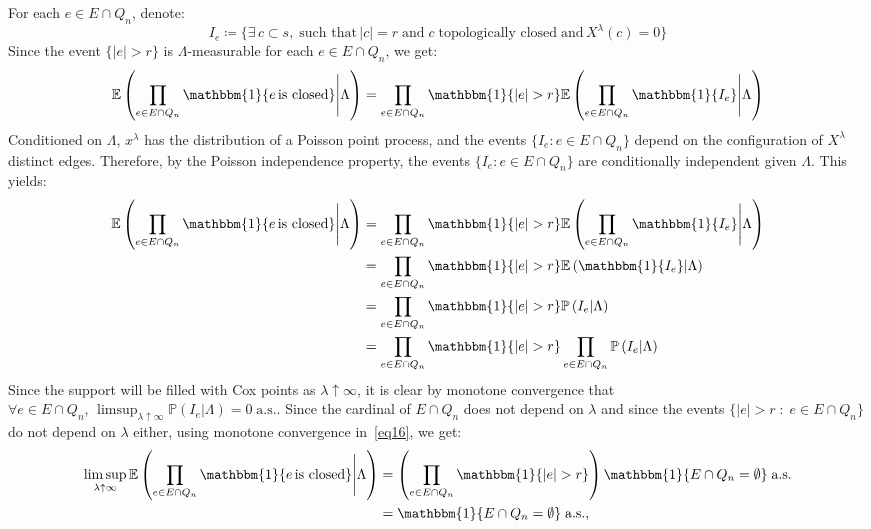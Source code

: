 \documentclass[10pt,a4paper]{amsart}
\theoremstyle{exampstyle}
\theoremstyle{exampnotations}
\begin{document}
For each $e \in E \cap Q_n$, denote:
$$I_e \coloneqq \lbrace \exists \, c \subset s, \; \text{such that} \, \vert c \vert = r \; \text{and} \; c  \; \text{topologically closed} \; \text{and} \,  X^{\lambda}(c) = 0 \rbrace$$
Since the event $\lbrace \vert e \vert > r \rbrace$ is $\Lambda$-measurable for each $e \in E \cap Q_n$, we get:
\begin{equation*}
\mathbb{E}\left( \prod_{e \in E \cap Q_n} \mathbbm{1} \lbrace e \, \text{is closed} \rbrace \Bigg\vert \Lambda \right) = \prod_{e \in E \cap Q_n} \mathbbm{1} \lbrace \vert e \vert > r \rbrace \mathbb{E}\left( \prod_{e \in E \cap Q_n}  \mathbbm{1} \lbrace I_e \rbrace \Bigg\vert \Lambda \right)
\end{equation*}
Conditioned on $\Lambda$, $x^{\lambda}$ has the distribution of a Poisson point process, and the events $\lbrace I_e : e \in E \cap Q_n \rbrace$ depend on the configuration of $X^{\lambda}$ distinct edges. Therefore, by the Poisson independence property, the events $\lbrace I_e : e \in E \cap Q_n \rbrace$ are conditionally independent given $\Lambda$. This yields:
\begin{align}
\nonumber \mathbb{E}\left( \prod_{e \in E \cap Q_n} \mathbbm{1} \lbrace e \, \text{is closed} \rbrace \Bigg\vert \Lambda \right) &= \prod_{e \in E \cap Q_n} \mathbbm{1} \lbrace \vert e \vert > r \rbrace \mathbb{E}\left( \prod_{e \in E \cap Q_n}  \mathbbm{1} \lbrace I_e \rbrace \Bigg\vert \Lambda \right)
\\ \nonumber  &= \prod_{e \in E \cap Q_n} \mathbbm{1} \lbrace \vert e \vert > r \rbrace \mathbb{E}\left(  \mathbbm{1} \lbrace I_e \rbrace \vert \Lambda \right)
\\ \nonumber &= \prod_{e \in E \cap Q_n} \mathbbm{1} \lbrace \vert e \vert > r \rbrace \mathbb{P}\left(   I_e  \vert \Lambda \right)
\\ \label{eq16} &= \prod_{e \in E \cap Q_n} \mathbbm{1} \lbrace \vert e \vert > r \rbrace \prod_{e \in E \cap Q_n}\mathbb{P}\left(   I_e  \vert \Lambda \right)
\end{align}
Since the support will be filled with Cox points as $\lambda \uparrow \infty$, it is clear by monotone convergence that $\displaystyle \forall e \in E \cap Q_n, \, \limsup_{\lambda \uparrow \infty} \mathbb{P}(I_e \vert \Lambda) = 0 \; \text{a.s.}$. Since the cardinal of $E \cap Q_n$ does not depend on $\lambda$ and since the events $\lbrace \vert e \vert > r \; : \; e \in E \cap Q_n \rbrace$ do not depend on $\lambda$ either, using monotone convergence in~\eqref{eq16}, we get:
\begin{align}
   \nonumber  \limsup_{\lambda \uparrow \infty} \mathbb{E}\left( \prod_{e \in E \cap Q_n} \mathbbm{1} \lbrace e \, \text{is closed} \rbrace \Bigg\vert \Lambda \right) &= \left(\prod_{e \in E \cap Q_n} \mathbbm{1} \lbrace \vert e \vert > r \rbrace \right) \mathbbm{1}\lbrace E \cap Q_n = \emptyset \rbrace \; \text{a.s.}
   \\ \label{eq17} &= \mathbbm{1} \lbrace E \cap Q_n = \emptyset \rbrace \; \text{a.s.},
\end{align}
\end{document}
